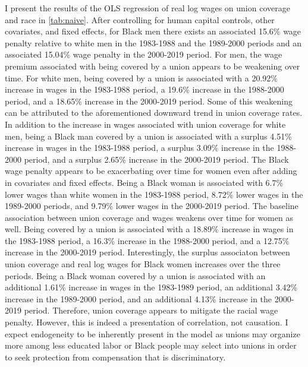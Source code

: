 \documentclass[11pt]{article}
\begin{document}
I present the results of the OLS regression of real log wages on union coverage and race in \autoref{tab:naive}. After controlling for human capital controls, other covariates, and fixed effects, for Black men there exists an associated 15.6\% wage penalty relative to white men in the 1983-1988 and the 1989-2000 periods and an associated 15.04\% wage penalty in the 2000-2019 period. For men, the wage premium associated with being covered by a union appears to be weakening over time. For white men, being covered by a union is associated with a 20.92\% increase in wages in the 1983-1988 period, a 19.6\% increase in the 1988-2000 period, and a 18.65\% increase in the 2000-2019 period. Some of this weakening can be attributed to the aforementioned downward trend in union coverage rates. In addition to the increase in wages associated with union coverage for white men, being a Black man covered by a union is associated with a surplus 4.51\% increase in wages in the 1983-1988 period, a surplus 3.09\% increase in the 1988-2000 period, and a surplus 2.65\% increase in the 2000-2019 period. The Black wage penalty appears to be exacerbating over time for women even after adding in covariates and fixed effects. Being a Black woman is associated with 6.7\% lower wages than white women in the 1983-1988 period, 8.72\% lower wages in the 1989-2000 periods, and 9.79\% lower wages in the 2000-2019 period. The baseline association between union coverage and wages weakens over time for women as well. Being covered by a union is associated with a 18.89\% increase in wages in the 1983-1988 period, a 16.3\% increase in the 1988-2000 period, and a 12.75\% increase in the 2000-2019 period. Interestingly, the surplus associaton between union coverage and real log wages for Black women increases over the three periods. Being a Black woman covered by a union is associated with an additional 1.61\% increase in wages in the 1983-1989 period, an additional 3.42\% increase in the 1989-2000 period, and an additional 4.13\% increase in the 2000-2019 period. Therefore, union coverage appears to mitigate the racial wage penalty. However, this is indeed a presentation of correlation, not causation. I expect endogeneity to be inherently present in the model as unions may organize more among less educated labor or Black people may select into unions in order to seek protection from compensation that is discriminatory.
\end{document}
